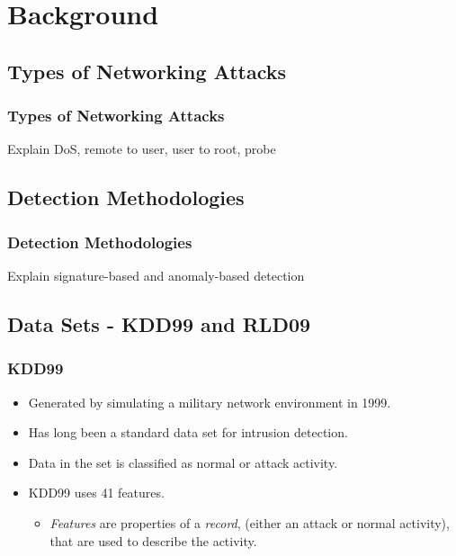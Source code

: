 \documentclass{beamer}
\begin{document}
\section[Background]{Background}
\subsection{Types of Networking Attacks}
\begin{frame}
  \frametitle{Types of Networking Attacks}
Explain DoS, remote to user, user to root, probe
\end{frame}


\subsection{Detection Methodologies}
\begin{frame}
  \frametitle{Detection Methodologies}
Explain signature-based and anomaly-based detection
\end{frame}


\subsection{Data Sets - KDD99 and RLD09}
\begin{frame}
  \frametitle{KDD99}
	\begin{itemize}
		\item Generated by simulating a military network environment in 1999.
		\item Has long been a standard data set for intrusion detection.
		\item Data in the set is classified as normal or attack activity.
		\item KDD99 uses 41 features.
		\begin{itemize}
		  	\item \emph{Features} are properties of a \emph{record}, (either an attack or normal activity), that are used to describe the activity.
		\end{itemize}

	\end{itemize}
\end{frame}
\end{document}
